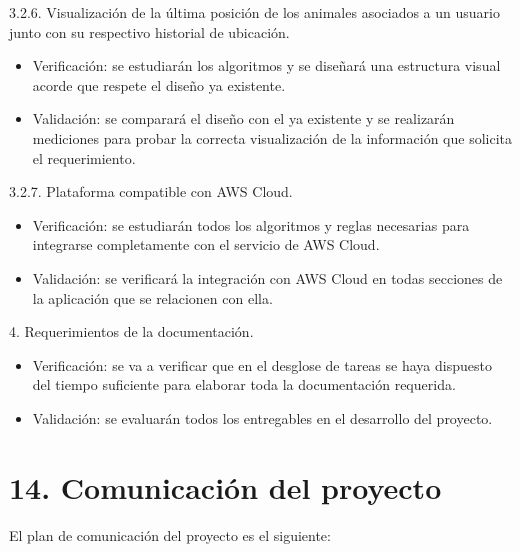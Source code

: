 \documentclass[11pt]{charter}
\begin{document}
3.2.6. Visualización de la última posición de los animales asociados a un usuario junto con su respectivo historial de ubicación. 
\begin{itemize}
	\item Verificación: se estudiarán los algoritmos y se diseñará una estructura visual acorde que respete el diseño ya existente. 
	\item Validación: se comparará el diseño con el ya existente y se realizarán mediciones para probar la correcta visualización de la información que solicita el requerimiento. 
\end{itemize}

3.2.7. Plataforma compatible con AWS Cloud.
\begin{itemize}
	\item Verificación: se estudiarán todos los algoritmos y reglas necesarias para integrarse completamente con el servicio de AWS Cloud. 
	\item Validación: se verificará la integración con AWS Cloud en todas secciones de la aplicación que se relacionen con ella. 
\end{itemize}

4. Requerimientos de la documentación.
\begin{itemize}
	\item Verificación: se va a verificar que en el desglose de tareas se haya dispuesto del tiempo suficiente para elaborar toda la documentación requerida. 
	\item Validación: se evaluarán todos los entregables en el desarrollo del proyecto. 
\end{itemize}

\vspace{250px}

\section{14. Comunicación del proyecto}
\label{sec:comunicaciones}

El plan de comunicación del proyecto es el siguiente:
\end{document}
